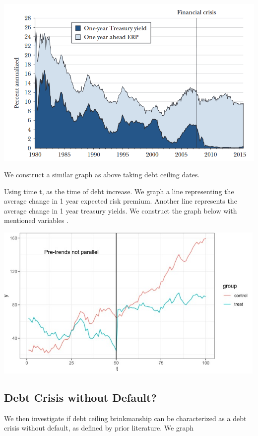 \documentclass[
  12pt]{article}
\begin{document}
\includegraphics[width=6.10417in,height=\textheight]{style-guide/1_year_ERP.png}

We construct a similar graph as above taking debt ceiling dates.

Using time t, as the time of debt increase. We graph a line representing
the average change in 1 year expected risk premium. Another line
represents the average change in 1 year treasury yields. We construct
the graph below with mentioned variables \citep{duarte2015}.

\includegraphics[width=5.21875in,height=\textheight]{style-guide/1_year_ERP_parallel_trends.jpeg}

\hypertarget{debt-crisis-without-default-1}{%
\subsection{Debt Crisis without
Default?}\label{debt-crisis-without-default-1}}

We then investigate if debt ceiling brinkmanship can be characterized as
a debt crisis without default, as defined by prior literature. We graph
\end{document}
